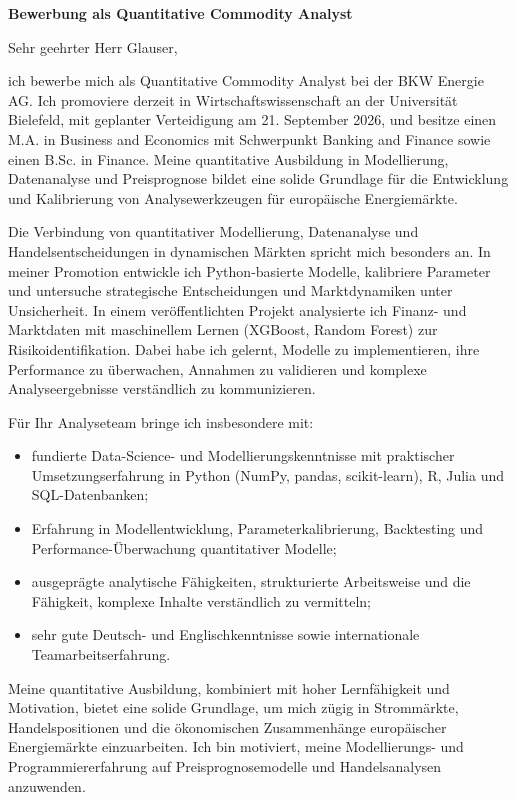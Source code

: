 \documentclass[11pt]{article}
\begin{document}
\vspace{0.15cm}

\noindent
\textbf{Bewerbung als Quantitative Commodity Analyst}

\vspace{0.15cm}

\noindent Sehr geehrter Herr Glauser,

ich bewerbe mich als Quantitative Commodity Analyst bei der BKW Energie AG. Ich promoviere derzeit in Wirtschaftswissenschaft an der Universität Bielefeld, mit geplanter Verteidigung am 21. September 2026, und besitze einen M.A. in Business and Economics mit Schwerpunkt Banking and Finance sowie einen B.Sc. in Finance. Meine quantitative Ausbildung in Modellierung, Datenanalyse und Preisprognose bildet eine solide Grundlage für die Entwicklung und Kalibrierung von Analysewerkzeugen für europäische Energiemärkte.

Die Verbindung von quantitativer Modellierung, Datenanalyse und Handelsentscheidungen in dynamischen Märkten spricht mich besonders an. In meiner Promotion entwickle ich Python-basierte Modelle, kalibriere Parameter und untersuche strategische Entscheidungen und Marktdynamiken unter Unsicherheit. In einem veröffentlichten Projekt analysierte ich Finanz- und Marktdaten mit maschinellem Lernen (XGBoost, Random Forest) zur Risikoidentifikation. Dabei habe ich gelernt, Modelle zu implementieren, ihre Performance zu überwachen, Annahmen zu validieren und komplexe Analyseergebnisse verständlich zu kommunizieren.

Für Ihr Analyseteam bringe ich insbesondere mit:

\begin{itemize}
    \item fundierte Data-Science- und Modellierungskenntnisse mit praktischer Umsetzungserfahrung in Python (NumPy, pandas, scikit-learn), R, Julia und SQL-Datenbanken;
    \item Erfahrung in Modellentwicklung, Parameterkalibrierung, Backtesting und Performance-Überwachung quantitativer Modelle;
    \item ausgeprägte analytische Fähigkeiten, strukturierte Arbeitsweise und die Fähigkeit, komplexe Inhalte verständlich zu vermitteln;
    \item sehr gute Deutsch- und Englischkenntnisse sowie internationale Teamarbeitserfahrung.
\end{itemize}

Meine quantitative Ausbildung, kombiniert mit hoher Lernfähigkeit und Motivation, bietet eine solide Grundlage, um mich zügig in Strommärkte, Handelspositionen und die ökonomischen Zusammenhänge europäischer Energiemärkte einzuarbeiten. Ich bin motiviert, meine Modellierungs- und Programmiererfahrung auf Preisprognosemodelle und Handelsanalysen anzuwenden.
\end{document}
